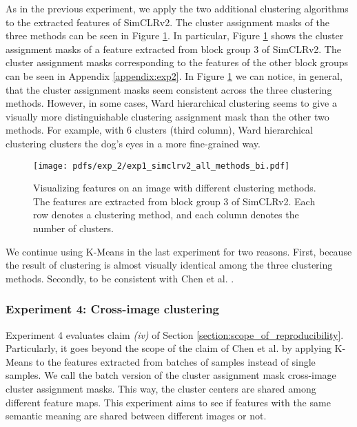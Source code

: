         
        As in the previous experiment, we apply the two additional clustering algorithms to the extracted features of SimCLRv2. The cluster assignment masks of the three methods can be seen in Figure \ref{fig:exp3.2_all_methods_simclr_v2_bi_block3}.
        In particular, Figure \ref{fig:exp3.2_all_methods_simclr_v2_bi_block3} shows the cluster assignment masks of a feature extracted from block group 3 of SimCLRv2. The cluster assignment masks corresponding to the features of the other block groups can be seen in Appendix \ref{appendix:exp2}. In Figure \ref{fig:exp3.2_all_methods_simclr_v2_bi_block3} we can notice, in general, that the cluster assignment masks seem consistent across the three clustering methods. However, in some cases, Ward hierarchical clustering seems to give a visually more distinguishable clustering assignment mask than the other two methods. For example, with 6 clusters (third column), Ward hierarchical clustering clusters the dog's eyes in a more fine-grained way.
        \begin{figure}[H]
            \centering
            \texttt{[image: pdfs/exp\_2/exp1\_simclrv2\_all\_methods\_bi.pdf]}
            \caption{Visualizing features on an image with different clustering methods. The features are  extracted from block group 3 of SimCLRv2. Each row denotes a clustering method, and each column denotes the number of clusters.}
            \label{fig:exp3.2_all_methods_simclr_v2_bi_block3}
        \end{figure}
        We continue using K-Means in the last experiment for two reasons. First, because the result of clustering is almost visually identical among the three clustering methods. Secondly, to be consistent with Chen et al. \cite{chen2021intriguing}.
    \subsubsection{Experiment 4: Cross-image clustering}
        Experiment 4 evaluates claim \textit{(iv)} of Section \ref{section:scope_of_reproducibility}. Particularly, it goes beyond the scope of the claim of Chen et al. \cite{chen2021intriguing} by applying K-Means to the features extracted from batches of  samples instead of single samples. We call the batch version of the cluster assignment mask cross-image cluster assignment masks. This way, the cluster centers are shared among different feature maps. This experiment aims to see if features with the same semantic meaning are shared between different images or not.
        

